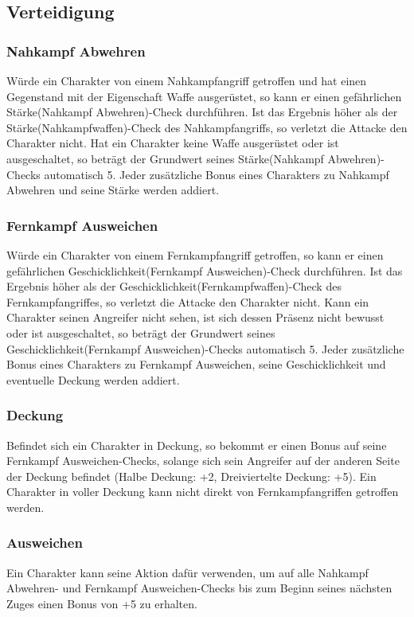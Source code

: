 \subsection{Verteidigung}
\subsubsection{Nahkampf Abwehren}
Würde ein Charakter von einem Nahkampfangriff getroffen und hat einen Gegenstand mit der Eigenschaft \glqq Waffe\grqq{} ausgerüstet, so kann er einen gefährlichen Stärke(Nahkampf Abwehren)-Check durchführen. Ist das Ergebnis höher als der Stärke(Nahkampfwaffen)-Check des Nahkampfangriffs, so verletzt die Attacke den Charakter nicht. Hat ein Charakter keine Waffe ausgerüstet oder ist ausgeschaltet, so beträgt der Grundwert seines Stärke(Nahkampf Abwehren)-Checks automatisch 5. Jeder zusätzliche Bonus eines Charakters zu Nahkampf Abwehren und seine Stärke werden addiert.
\subsubsection{Fernkampf Ausweichen}
Würde ein Charakter von einem Fernkampfangriff getroffen, so kann er einen gefährlichen Geschicklichkeit(Fernkampf Ausweichen)-Check durchführen. Ist das Ergebnis höher als der Geschicklichkeit(Fernkampfwaffen)-Check des Fernkampfangriffes, so verletzt die Attacke den Charakter nicht. Kann ein Charakter seinen Angreifer nicht sehen, ist sich dessen Präsenz nicht bewusst oder ist ausgeschaltet, so beträgt der Grundwert seines Geschicklichkeit(Fernkampf Ausweichen)-Checks automatisch 5. Jeder zusätzliche Bonus eines Charakters zu Fernkampf Ausweichen, seine Geschicklichkeit und eventuelle Deckung werden addiert.
\subsubsection{Deckung}
Befindet sich ein Charakter in Deckung, so bekommt er einen Bonus auf seine Fernkampf Ausweichen-Checks, solange sich sein Angreifer auf der anderen Seite der Deckung befindet (Halbe Deckung: +2, Dreiviertelte Deckung: +5). Ein Charakter in voller Deckung kann nicht direkt von Fernkampfangriffen getroffen werden.
\subsubsection{Ausweichen}
Ein Charakter kann seine Aktion dafür verwenden, um auf alle Nahkampf Abwehren- und Fernkampf Ausweichen-Checks bis zum Beginn seines nächsten Zuges einen Bonus von +5 zu erhalten.
